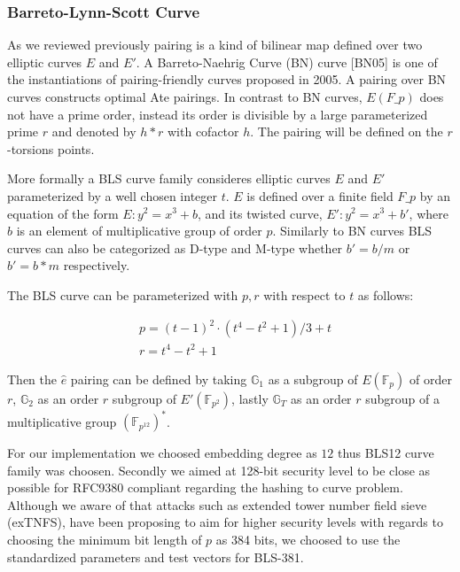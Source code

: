 \subsubsection{Barreto-Lynn-Scott Curve}

As we reviewed previously pairing is a kind of bilinear map defined over two elliptic curves $E$ and $E'$. 
A Barreto-Naehrig Curve (BN) curve [BN05] is one of the instantiations of pairing-friendly curves proposed in 2005. A pairing over BN curves constructs optimal Ate pairings. In contrast to BN curves, $E(F\_p)$ does not have a prime order, instead its order is divisible by a large parameterized prime $r$ and denoted by $h * r$ with cofactor $h$. The pairing will be defined on the $r$-torsions points.\cite{ecc.pairing.curves.bls}

More formally a BLS curve family consideres elliptic curves $E$ and $E'$ parameterized by a well chosen integer $t$. $E$ is defined over a finite field $F\_p$ by an equation of the form $E: y^2 = x^3 + b$, and its twisted curve, $E': y^2 = x^3 + b'$, where $b$ is an element of multiplicative group of order $p$.
Similarly to BN curves BLS curves can also be categorized as D-type and M-type whether $b' = b / m$ or $b' = b * m$ respectively.\cite{ecc.pairing.curves.bls}

The BLS curve can be parameterized with $p, r$  with respect to $t$ as follows\cite{ecc.pairing.curves.bls}: 

	\begin{align}
	&p= (t - 1)^2 \cdot (t^4 - t^2 + 1) / 3 + t \\
	&r= t^4 - t^2 + 1
\end{align}

Then the $\hat{e}$ pairing can be defined by taking $\mathbb{G}_1$  as a subgroup of $E(\mathbb{F}_p)$ of order $r$, $\mathbb{G}_2$ as an order $r$ subgroup of $E'(\mathbb{F}_{p^2})$, lastly $\mathbb{G}_T$ as  an order $r$ subgroup of a multiplicative group $(\mathbb{F}_{p^12})^* $. \cite{ecc.pairing.curves.bls} 

For our implementation we choosed embedding degree as $12$ thus BLS12 curve family was choosen.
Secondly we aimed at 128-bit security level to be close as possible for RFC9380 compliant regarding the hashing to curve problem. Although we aware of that attacks such as extended tower number field sieve (exTNFS), have been proposing to aim for higher security levels with regards to choosing the minimum bit length of $p$ as 384 bits\cite{ecc.pairing.curves.bls}, we choosed to use the standardized parameters and test vectors for BLS-381.

